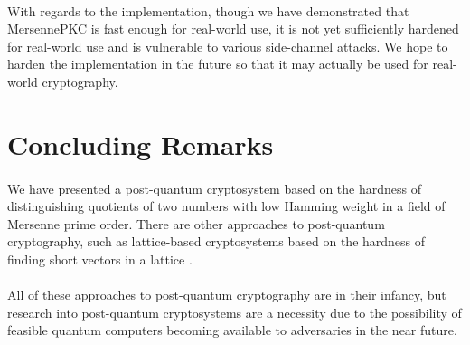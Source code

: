 \paragraph{}
With regards to the implementation, though we have demonstrated that MersennePKC is fast enough for real-world use, it is not yet sufficiently hardened for real-world use and is vulnerable to various side-channel attacks. We hope to harden the implementation in the future so that it may actually be used for real-world cryptography.

\section{Concluding Remarks}
\paragraph{}
We have presented a post-quantum cryptosystem based on the hardness of distinguishing quotients of two numbers with low Hamming weight in a field of Mersenne prime order. There are other approaches to post-quantum cryptography, such as lattice-based cryptosystems based on the hardness of finding short vectors in a lattice \cite{regev2009lattices}.

\paragraph{}
All of these approaches to post-quantum cryptography are in their infancy, but research into post-quantum cryptosystems are a necessity due to the possibility of feasible quantum computers becoming available to adversaries in the near future.